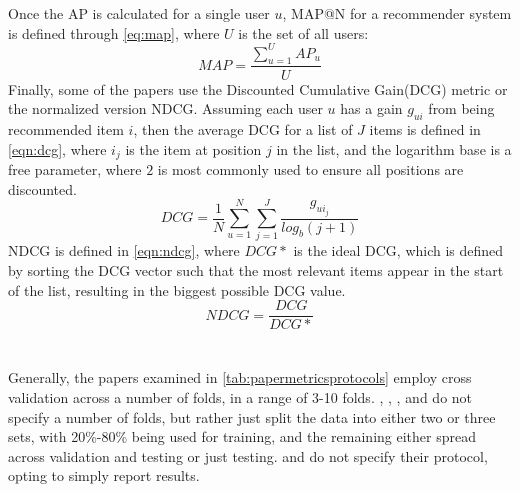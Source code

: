 Once the AP is calculated for a single user $u$, MAP@N for a recommender system is defined through \autoref{eq:map}, where $U$ is the set of all users: 
\begin{equation}
    \label{eq:map}
    MAP = \frac{\sum\limits_{u=1}^U AP_u}{U}
\end{equation}
Finally, some of the papers use the Discounted Cumulative Gain(DCG) metric or the normalized version NDCG.
Assuming each user $u$ has a gain $g_{ui}$ from being recommended item $i$, then the average DCG for a list of $J$ items is defined in \autoref{eqn:dcg}, where $i_j$ is the item at position $j$ in the list, and the logarithm base is a free parameter, where $2$ is most commonly used to ensure all positions are discounted.
\begin{equation}
    \label{eqn:dcg}
    DCG = \frac{1}{N} \sum\limits_{u=1}^N \sum\limits_{j = 1}^J \frac{g_{ui_j}}{log_b (j+1)}
\end{equation}
NDCG is defined in \autoref{eqn:ndcg}, where $DCG*$ is the ideal DCG, which is defined by sorting the DCG vector such that the most relevant items appear in the start of the list\cite{dcgpaper}, resulting in the biggest possible DCG value.
\begin{equation}
    \label{eqn:ndcg}
    NDCG = \frac{DCG}{DCG*}
\end{equation}
\\\\
Generally, the papers examined in \autoref{tab:papermetricsprotocols} employ cross validation across a number of folds, in a range of 3-10 folds.
\cite{GameTheoretic}, \cite{Soft-RoughArticle}, \cite{SinghUserItem}, \cite{StackedRecurrentNeuralPaper} and \cite{ContextualInfluencePaper} do not specify a number of folds, but rather just split the data into either two or three sets, with 20\%-80\% being used for training, and the remaining either spread across validation and testing or just testing.
\cite{AuxiliaryInformationPaper} and \cite{ArtificalBeePaper} do not specify their protocol, opting to simply report results.

